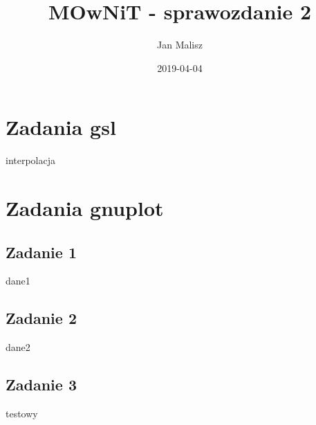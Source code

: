 \documentclass[10pt,a4paper]{article}
\title{MOwNiT - sprawozdanie 2}
\author{Jan Malisz}
\date{2019-04-04}
\begin{document}
  \maketitle
  \thispagestyle{empty}
  \newpage

  \section*{Zadania gsl}\label{sec:ZadaniaGsl}
  {interpolacja}

  \section*{Zadania gnuplot}\label{sec:ZadaniaGnuplot}
  \subsection*{Zadanie 1}\label{sec:Zadanie1}
  {dane1}

  \subsection*{Zadanie 2}\label{sec:Zadanie2}
  {dane2}

  \subsection*{Zadanie 3}\label{sec:Zadanie3}
  {testowy}
\end{document}
